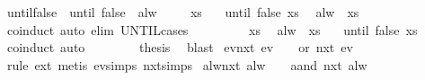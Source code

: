 \begin{isabellebody}
%
\isadelimproof
\isanewline
%
\endisadelimproof
\isanewline
{}\isamarkupfalse%
\ until{\isacharunderscore}false{\isacharcolon}\ {\isachardoublequoteopen}{\isasymphi}\ until\ false\ {\isacharequal}\ alw\ {\isasymphi}{\isachardoublequoteclose}\isanewline
%
\isadelimproof
%
\endisadelimproof
%
\isatagproof
{}\isamarkupfalse%
{\isacharminus}\isanewline
\ \ \isacommand{{\isacharbraceleft}}\isamarkupfalse%
\isamarkupfalse%
\ xs\ \isamarkupfalse%
\ {\isachardoublequoteopen}{\isacharparenleft}{\isasymphi}\ until\ false{\isacharparenright}\ xs{\isachardoublequoteclose}\ \isamarkupfalse%
\ {\isachardoublequoteopen}alw\ {\isasymphi}\ xs{\isachardoublequoteclose}\isanewline
\ \ \ \isamarkupfalse%
\ coinduct\ {\isacharparenleft}auto\ elim{\isacharcolon}\ UNTIL{\isachardot}cases{\isacharparenright}\isanewline
\ \ \isacommand{{\isacharbraceright}}\isamarkupfalse%
\isanewline
\ \ \isamarkupfalse%
\isanewline
\ \ \isacommand{{\isacharbraceleft}}\isamarkupfalse%
\isamarkupfalse%
\ xs\ \isamarkupfalse%
\ {\isachardoublequoteopen}alw\ {\isasymphi}\ xs{\isachardoublequoteclose}\ \isamarkupfalse%
\ {\isachardoublequoteopen}{\isacharparenleft}{\isasymphi}\ until\ false{\isacharparenright}\ xs{\isachardoublequoteclose}\isanewline
\ \ \ \isamarkupfalse%
\ coinduct\ auto\isanewline
\ \ \isacommand{{\isacharbraceright}}\isamarkupfalse%
\isanewline
\ \ \isamarkupfalse%
\ \isamarkupfalse%
\ {\isacharquery}thesis\ \isamarkupfalse%
\ blast\isanewline
{}\isamarkupfalse%
%
\endisatagproof
{\isafoldproof}%
%
\isadelimproof
\isanewline
%
\endisadelimproof
\isanewline
{}\isamarkupfalse%
\ ev{\isacharunderscore}nxt{\isacharcolon}\ {\isachardoublequoteopen}ev\ {\isasymphi}\ {\isacharequal}\ {\isacharparenleft}{\isasymphi}\ or\ nxt\ {\isacharparenleft}ev\ {\isasymphi}{\isacharparenright}{\isacharparenright}{\isachardoublequoteclose}\isanewline
%
\isadelimproof
%
\endisadelimproof
%
\isatagproof
{}\isamarkupfalse%
\ {\isacharparenleft}rule\ ext{\isacharparenright}\ {\isacharparenleft}metis\ ev{\isachardot}simps\ nxt{\isachardot}simps{\isacharparenright}%
\endisatagproof
{\isafoldproof}%
%
\isadelimproof
\isanewline
%
\endisadelimproof
\isanewline
{}\isamarkupfalse%
\ alw{\isacharunderscore}nxt{\isacharcolon}\ {\isachardoublequoteopen}alw\ {\isasymphi}\ {\isacharequal}\ {\isacharparenleft}{\isasymphi}\ aand\ nxt\ {\isacharparenleft}alw\ {\isasymphi}{\isacharparenright}{\isacharparenright}{\isachardoublequoteclose}\isanewline

\end{isabellebody}
